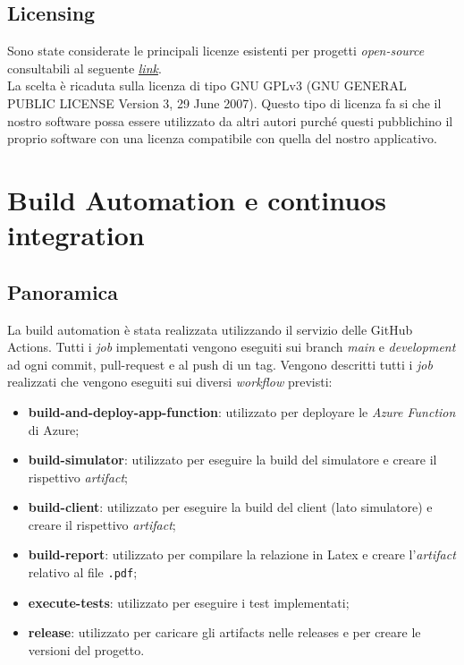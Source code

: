 \subsection{Licensing}
Sono state considerate le principali licenze esistenti per progetti \textit{open-source} consultabili al seguente \href{https://choosealicense.com/licenses/}{\textit{link}}. \\
\newline La scelta è ricaduta sulla licenza di tipo GNU GPLv3 (GNU GENERAL PUBLIC LICENSE Version 3, 29 June 2007).
Questo tipo di licenza fa si che il nostro software possa essere utilizzato da altri autori purché questi pubblichino il proprio software con una licenza compatibile con quella del nostro applicativo.

\section{Build Automation e continuos integration}

\subsection{Panoramica}
La build automation è stata realizzata utilizzando il servizio delle GitHub Actions. Tutti i \textit{job} implementati vengono eseguiti sui branch \textit{main} e \textit{development} ad ogni commit, pull-request e al push di un tag. Vengono descritti tutti i \textit{job} realizzati che vengono eseguiti sui diversi \textit{workflow} previsti:

\begin{itemize}
    \item \textbf{build-and-deploy-app-function}: utilizzato per deployare le \textit{Azure Function} di Azure;
    
    \item \textbf{build-simulator}: utilizzato per eseguire la build del simulatore e creare il rispettivo \textit{artifact};
    
    \item \textbf{build-client}: utilizzato per eseguire la build del client (lato simulatore) e creare il rispettivo \textit{artifact};
    
    \item \textbf{build-report}: utilizzato per compilare la relazione in Latex e creare l'\textit{artifact} relativo al file \texttt{.pdf};
    
    \item \textbf{execute-tests}: utilizzato per eseguire i test implementati;
    
    \item \textbf{release}: utilizzato per caricare gli artifacts nelle releases e per creare le versioni del progetto.
    
\end{itemize}

